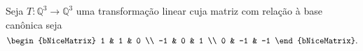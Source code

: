 \begin{questions}
\begin{solutionordottedlines}
\begin{parts}
			\part

		\end{parts}
	\end{solutionordottedlines}

	\question\label{exercício:2.20}

	Seja $T\colon\mathbb{Q}^{3}\to\mathbb{Q}^{3}$ uma transformação linear
	cuja matriz com relação à base canônica seja
	\[
		\begin{bNiceMatrix}
			1  & 1  & 0  \\
			-1 & 0  & 1  \\
			0  & -1 & -1
		\end{bNiceMatrix}.
	\]



	\begin{solutionordottedlines}
		\begin{parts}
			\part


			\part


			\part

		\end{parts}
	\end{solutionordottedlines}
\end{questions}

